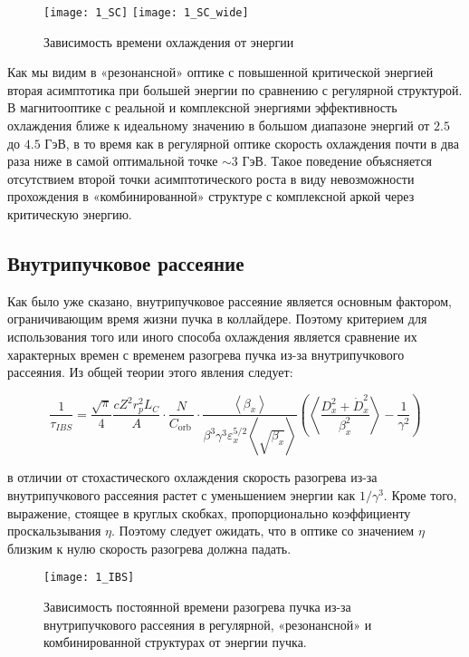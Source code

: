 \begin{figure}[!h]
  \centering
   \texttt{[image: 1\_SC]}
   \texttt{[image: 1\_SC\_wide]}
   \caption{Зависимость времени охлаждения от энергии}
   \label{fig:1_SC}
\end{figure}

Как мы видим в «резонансной» оптике с повышенной критической энергией вторая асимптотика при большей энергии по сравнению с регулярной структурой. В магнитооптике с реальной и комплексной энергиями эффективность охлаждения ближе к идеальному значению в большом диапазоне энергий от $2.5$ до $4.5$ ГэВ, в то время как в регулярной оптике скорость охлаждения почти в два раза ниже в самой оптимальной точке $\sim3$ ГэВ. Такое поведение объясняется отсутствием второй точки асимптотического роста в виду невозможности прохождения в «комбинированной» структуре с комплексной аркой через критическую энергию.

\subsection{Внутрипучковое рассеяние}

\par  Как было уже сказано, внутрипучковое рассеяние является основным фактором, ограничивающим время жизни пучка в коллайдере. Поэтому критерием для использования того или иного способа охлаждения является сравнение их характерных времен с временем разогрева пучка из-за внутрипучкового рассеяния. Из общей теории этого явления следует:

\begin{equation}
\frac{1}{\tau_{IBS}}=\frac{\sqrt\pi}{4}\frac{cZ^2r_p^2L_C}{A}\cdot\frac{N}{C_{\mathrm{orb\ }}}\cdot\frac{\left\langle\beta_x\right\rangle}{\beta^3\gamma^3\varepsilon_x^{5/2}\left\langle\sqrt{\beta_x}\right\rangle}\left(\left\langle\frac{D_x^2+{\dot{D}}_x^2}{\beta_x^2}\right\rangle-\frac{1}{\gamma^2}\right)
\end{equation}

в отличии от стохастического охлаждения скорость разогрева из-за внутрипучкового рассеяния растет с уменьшением энергии как $1/\gamma^3$. Кроме того, выражение, стоящее в круглых скобках, пропорционально коэффициенту проскальзывания $\eta$. Поэтому следует ожидать, что в оптике со значением $\eta$ близким к нулю скорость разогрева должна падать. 

\begin{figure}[!h]
  \centering
   \texttt{[image: 1\_IBS]}
   \caption{Зависимость постоянной времени разогрева пучка из-за внутрипучкового рассеяния в регулярной, «резонансной» и комбинированной структурах от энергии пучка.}
   \label{fig:1_IBS}
\end{figure}

